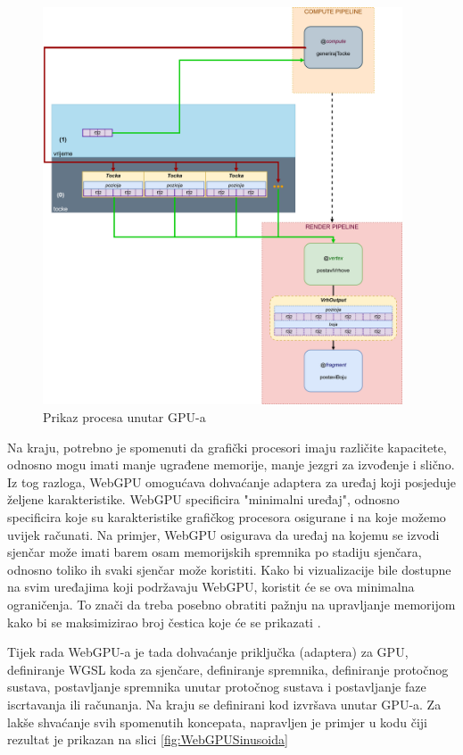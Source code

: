 \documentclass{foi}
\begin{document}
\begin{figure}[H]
	\centering
	\includegraphics[width=0.95\textwidth]{slike/39_Buffers.png}
	\captionsetup{justification=centering}
	\caption{Prikaz procesa unutar GPU-a}
	\label{fig:Buffers}
\end{figure}


Na kraju, potrebno je spomenuti da grafički procesori imaju različite kapacitete, odnosno mogu imati manje ugrađene memorije, manje jezgri za izvođenje i slično. Iz tog razloga, WebGPU omogućava dohvaćanje adaptera za uređaj koji posjeduje željene karakteristike. WebGPU specificira "minimalni uređaj", odnosno specificira koje su karakteristike grafičkog procesora osigurane i na koje možemo uvijek računati. Na primjer, WebGPU osigurava da uređaj na kojemu se izvodi sjenčar može imati barem osam memorijskih spremnika po stadiju sjenčara, odnosno toliko ih svaki sjenčar može koristiti. Kako bi vizualizacije bile dostupne na svim uređajima koji podržavaju WebGPU, koristit će se ova minimalna ograničenja. To znači da treba posebno obratiti pažnju na upravljanje memorijom kako bi se maksimizirao broj čestica koje će se prikazati \parencite{WebGPUFundamentalsOptionalLimits}.
 
Tijek rada WebGPU-a je tada dohvaćanje priključka (adaptera) za GPU, definiranje WGSL koda za sjenčare, definiranje spremnika, definiranje protočnog sustava, postavljanje spremnika unutar protočnog sustava i postavljanje faze iscrtavanja ili računanja. Na kraju se definirani kod izvršava unutar GPU-a. Za lakše shvaćanje svih spomenutih koncepata, napravljen je primjer u kodu čiji rezultat je prikazan na slici \ref{fig:WebGPUSinusoida}
\end{document}
